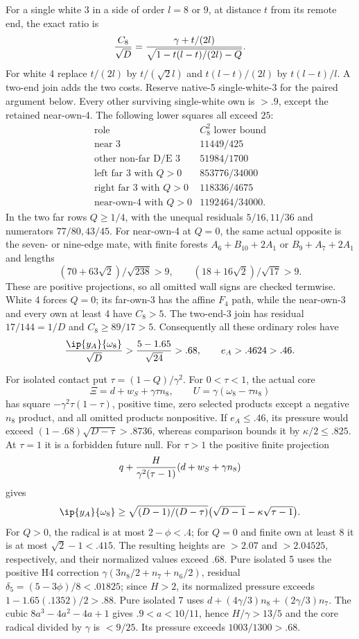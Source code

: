 For a single white 3 in a side of order \(l=8\) or \(9\),
at distance \(t\) from its remote end, the exact ratio is
\[
 {C_8\over\sqrt D}
 ={\gamma+t/(2l)\over
       \sqrt{1-t(l-t)/(2l)-Q}}.
\]
For white 4 replace \(t/(2l)\) by \(t/(\sqrt2l)\) and
\(t(l-t)/(2l)\) by \(t(l-t)/l\).
A two-end join adds the two costs.
Reserve native-5 single-white-3 for the paired argument below.
Every other surviving single-white own is \(>.9\), except the
retained near-own-4.
The following lower squares all exceed \(25\):
\[
\begin{array}{c|c}
\text{role}& C_8^2\text{ lower bound}\\ \hline
\text{near 3}&11449/425\\
\text{other non-far D/E 3}&51984/1700\\
\text{left far 3 with }Q>0&853776/34000\\
\text{right far 3 with }Q>0&118336/4675\\
\text{near-own-4 with }Q>0&1192464/34000 .
\end{array}
\]
In the two far rows \(Q\ge1/4\), with the unequal residuals
\(5/16,11/36\) and numerators \(77/80,43/45\).
For near-own-4 at \(Q=0\), the same actual opposite is the
seven- or nine-edge mate, with finite forests
\(A_6+B_{10}+2A_1\) or \(B_9+A_7+2A_1\) and lengths
\[
 (70+63\sqrt2)/\sqrt{238}>9,\qquad
 (18+16\sqrt2)/\sqrt{17}>9.
\]
These are positive projections, so all omitted wall signs are
checked termwise.
White 4 forces \(Q=0\); its far-own-3 has the affine \(F_4\)
path, while the near-own-3 and every own at least 4 have \(C_8>5\).
The two-end-3 join has residual \(17/144=1/D\) and
\(C_8\ge89/17>5\).
Consequently all these ordinary roles have
\[
 {\ip{y_A}{\omega_8}\over\sqrt D}
 >{5-1.65\over\sqrt{24}}>.68,\qquad e_A>.4624>.46.
\]

For isolated contact put \(\tau=(1-Q)/\gamma^2\).
For \(0<\tau<1\), the actual core
\[
 \Xi=d+w_S+\gamma\tau n_8,\qquad
 U=\gamma(\omega_8-\tau n_8)
\]
has square \(-\gamma^2\tau(1-\tau)\), positive time,
zero selected products except a negative \(n_8\) product,
and all omitted products nonpositive.
If \(e_A\le.46\), its pressure would exceed
\((1-.68)\sqrt{D-\tau}>.8736\), whereas comparison bounds
it by \(\kappa/2\le.825\).
At \(\tau=1\) it is a forbidden future null.
For \(\tau>1\) the positive finite projection
\[
 q+{H\over\gamma^2(\tau-1)}
          (d+w_S+\gamma n_8)
\]
gives
\[
 \ip{y_A}{\omega_8}\ge
 \sqrt{(D-1)/(D-\tau)}
       \bigl(\sqrt{D-1}-\kappa\sqrt{\tau-1}\bigr).
\]
For \(Q>0\), the radical is at most \(2-\phi<.4\);
for \(Q=0\) and finite own at least 8 it is at most
\(\sqrt2-1<.415\).  The resulting heights are
\(>2.07\) and \(>2.04525\), respectively, and their normalized
values exceed \(.68\).
Pure isolated 5 uses the positive H4 correction
\(\gamma(3n_8/2+n_7+n_6/2)\), residual
\(\delta_5=(5-3\phi)/8<.01825\);
since \(H>2\), its normalized pressure exceeds
\(1-1.65(.1352)/2>.88\).
Pure isolated 7 uses \(d+(4\gamma/3)n_8+(2\gamma/3)n_7\).
The cubic \(8a^3-4a^2-4a+1\) gives
\(.9<a<10/11\), hence \(H/\gamma>13/5\) and the
core radical divided by \(\gamma\) is \(<9/25\).
Its pressure exceeds \(1003/1300>.68\).

